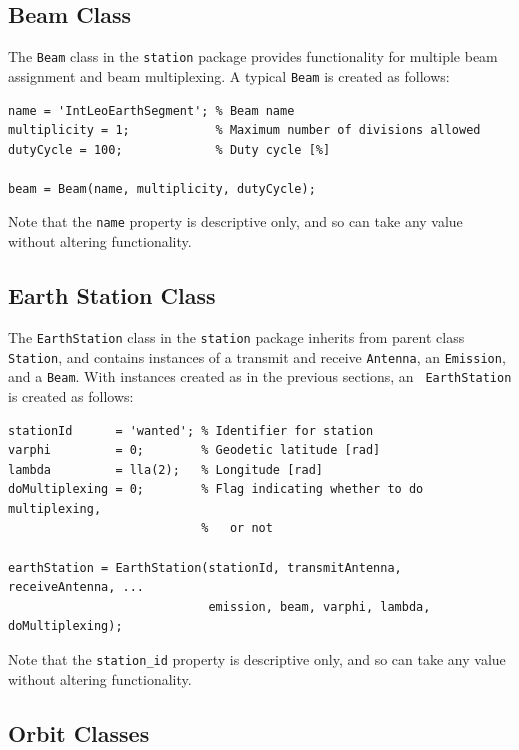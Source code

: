 \documentclass[11pt]{article}
\begin{document}
\subsection{Beam Class}

The \texttt{\small Beam} class in the \texttt{\small station} package
provides functionality for multiple beam assignment and beam
multiplexing. A typical \texttt{\small Beam} is created as follows:
{\small
\begin{verbatim}
name = 'IntLeoEarthSegment'; % Beam name
multiplicity = 1;            % Maximum number of divisions allowed
dutyCycle = 100;             % Duty cycle [%]

beam = Beam(name, multiplicity, dutyCycle);
\end{verbatim}
}
\noindent Note that the \texttt{\small name} property is descriptive
only, and so can take any value without altering functionality.

\subsection{Earth Station Class}

The \texttt{\small EarthStation} class in the \texttt{\small station}
package inherits from parent class \texttt{\small Station}, and
contains instances of a transmit and receive \texttt{\small Antenna},
an \texttt{\small Emission}, and a \texttt{\small Beam}. With
instances created as in the previous sections, an \texttt{\small
  EarthStation} is created as follows:
{\small
\begin{verbatim}
stationId      = 'wanted'; % Identifier for station
varphi         = 0;        % Geodetic latitude [rad]
lambda         = lla(2);   % Longitude [rad]
doMultiplexing = 0;        % Flag indicating whether to do multiplexing,
                           %   or not

earthStation = EarthStation(stationId, transmitAntenna, receiveAntenna, ...
                            emission, beam, varphi, lambda, doMultiplexing);
\end{verbatim}
}
\noindent Note that the \texttt{\small station\_id} property is
descriptive only, and so can take any value without altering
functionality.

\subsection{Orbit Classes}
\end{document}
